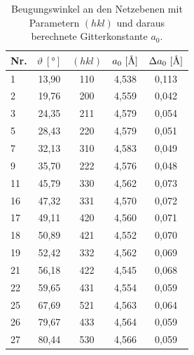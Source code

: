 \documentclass[a4paper,twoside,final]{article}
\begin{document}
\begin{table}[ht]
	\centering
	\caption{Beugungswinkel an den Netzebenen mit Parametern $(hkl)$ und daraus berechnete Gitterkonstante $a_0$.}
	\label{tab:Ergebnisse}
	\begin{tabular}{l c c c c}
		\toprule
      Nr. & $\vartheta~[\si{\degree}]$ & $(hkl)$ & $a_0~[\si{\textup{\AA}}]$ & $\Delta a_0~[\si{\textup{\AA}}]$\\
    \midrule
    1  & 13,90 & 110 & 4,538 & 0,113 \\
    2  & 19,76 & 200 & 4,559 & 0,042 \\
    3  & 24,35 & 211 & 4,579 & 0,054 \\
    5  & 28,43 & 220 & 4,579 & 0,051 \\
    7  & 32,13 & 310 & 4,583 & 0,049 \\
    9  & 35,70 & 222 & 4,576 & 0,048 \\
    11 & 45,79 & 330 & 4,562 & 0,073 \\
    16 & 47,32 & 331 & 4,570 & 0,072 \\
    17 & 49,11 & 420 & 4,560 & 0,071 \\
    18 & 50,89 & 421 & 4,552 & 0,070 \\
    19 & 52,42 & 332 & 4,562 & 0,069 \\
    21 & 56,18 & 422 & 4,545 & 0,068 \\
    22 & 59,65 & 431 & 4,554 & 0,059 \\
    25 & 67,69 & 521 & 4,563 & 0,064 \\
    26 & 79,67 & 433 & 4,564 & 0,059 \\
    27 & 80,44 & 530 & 4,566 & 0,059
	\end{tabular}
\end{table}
\end{document}
